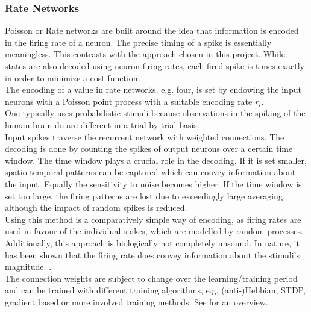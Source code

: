 \subsubsection{Rate Networks}
Poisson or Rate networks are built around the idea that information is encoded in the firing rate of a neuron. The precise timing of a spike is essentially meaningless\cite{brette_philosophy_2015}. This contrasts with the approach chosen in this project. While states are also decoded using neuron firing rates, each fired spike is times exactly in order to minimize a cost function.\\
The encoding of a value in rate networks, e.g. four, is set by endowing the input neurons with a Poisson point process with a suitable encoding rate $r_i$\cite{deneve_efficient_2016}.\\
One typically uses probabilistic stimuli because observations in the spiking of the human brain do are different in a trial-by-trial basis.\\
Input spikes traverse the recurrent network with weighted connections. The decoding is done by counting the spikes of output neurons over a certain time window. The time window plays a crucial role in the decoding. If it is set smaller, spatio temporal patterns can be captured which can convey information about the input. Equally the sensitivity to noise becomes higher. If the time window is set too large, the firing patterns are lost due to exceedingly large averaging, although the impact of random spikes is reduced.\\
Using this method is a comparatively simple way of encoding, as firing rates are used in favour of the individual spikes, which are modelled by random processes. Additionally, this approach is biologically not completely unsound. In nature, it has been shown that the firing rate does convey information about the stimuli's magnitude. \cite{adrian_impulses_1926}.\\
The connection weights are subject to change over the learning/training period\cite{almomani_comparative_2019} and can be trained with different training algorithms, e.g. (anti-)Hebbian, \ac{STDP}, gradient based or more involved training methods\cite{demin_recurrent_2018}. See \cite{yi_learning_2023} for an overview.\\


